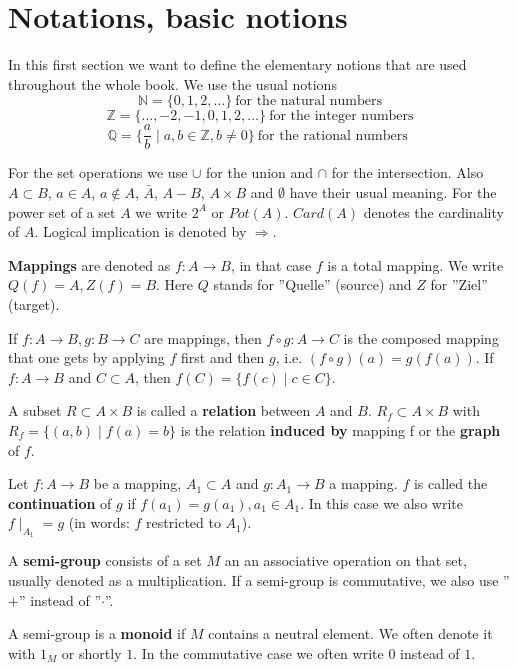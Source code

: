 \section{Notations, basic notions}

In this first section we want to define the elementary notions that are used
throughout the whole book. We use the usual notions
\[ \mathbb{N} = \{ 0, 1, 2, \ldots \}\ \mbox{for the natural numbers} \]
\[ \mathbb{Z} = \{ \ldots, -2, -1, 0, 1, 2, \ldots \}\ \mbox{for the integer
numbers} \]
\[ \mathbb{Q} = \{ \frac{a}{b} \mid a,b \in \mathbb{Z}, b \neq 0 \}\ \mbox{for
the rational numbers } \]

For the set operations we use $\cup$ for the union and $\cap$ for the
intersection. Also $A \subset B$, $a \in A$, $a \not\in A$, $\bar{A}$, $A - B$,
$A \times B$ and $\emptyset$ have their usual meaning. For the power set of a
set $A$ we write $2^A$ or $Pot(A)$. $Card(A)$ denotes the cardinality of $A$.
Logical implication is denoted by $\Rightarrow$.

{\bf Mappings} are denoted as $f : A \rightarrow B$, in that case $f$ is a
total mapping. We write $Q(f) = A, Z(f) = B$. Here $Q$ stands for ''Quelle'' (source)
and $Z$ for ''Ziel'' (target).

If $f: A \rightarrow B, g : B \rightarrow C$ are mappings, then $f \circ g : A
\rightarrow C$ is the composed mapping that one gets by applying $f$ first and
then $g$, i.e. $(f \circ g)(a) = g(f(a))$. If $f:A \rightarrow B$ and $C
\subset A$, then $f(C) = \{ f(c) \mid c \in C \}$.

A subset $R \subset A \times B$ is called a {\bf relation} between $A$ and $B$.
$R_f \subset A \times B$ with $R_f = \{ (a,b) \mid f(a) = b \}$ is the relation
{\bf induced by} mapping f or the {\bf graph} of $f$.

Let $f : A \rightarrow B$ be a mapping, $A_1 \subset A$ and $g : A_1 \rightarrow
B$ a mapping. $f$ is called the {\bf continuation} of $g$ if $f(a_1) = g(a_1),
a_1 \in A_1$. In this case we also write $f \mid _{A_1} = g$ (in words: $f$
restricted to $A_1$).

A {\bf semi-group} consists of a set $M$ an an associative operation on that
set, usually denoted as a multiplication. If a semi-group is commutative, we
also use ''$+$'' instead of ''$\cdot$''.

A semi-group is a {\bf monoid} if $M$ contains a neutral element. We often
denote it with $1_M$ or shortly $1$. In the commutative case we often write $0$
instead of $1$.

